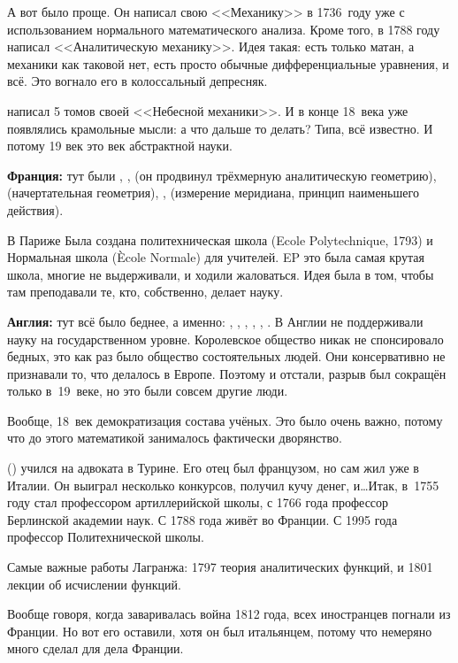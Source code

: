 \documentclass[a4paper,oneside,fleqn,10pt]{article}
\begin{document}
А вот  было проще. Он написал свою <<Механику>> в
1736~году уже с использованием нормального математического
анализа. Кроме того, в 1788 году  написал
<<Аналитическую механику>>. Идея такая: есть только матан, а механики
как таковой нет, есть просто обычные дифференциальные уравнения, и
всё. Это вогнало его в колоссальный депресняк.

  написал 5 томов своей <<Небесной
механики>>. И в конце 18~века уже появлялись крамольные мысли: а что
дальше то делать? Типа, всё известно.  И потому 19 век это век
абстрактной науки.

\textbf{Франция:} тут были , , 
(он продвинул трёхмерную аналитическую геометрию), 
(начертательная геометрия), , 
(измерение меридиана, принцип наименьшего действия).

В Париже Была создана политехническая школа (Ecole Polytechnique,
1793) и Нормальная школа (\`Ecole Normale) для учителей.  EP это была
самая крутая школа, многие не выдерживали, и ходили жаловаться.  Идея
была в том, чтобы там преподавали те, кто, собственно, делает науку.

\textbf{Англия:} тут всё было беднее, а именно: ,
, , , ,
.  В Англии не поддерживали науку на государственном
уровне. Королевское общество никак не спонсировало бедных, это как раз
было общество состоятельных людей.  Они консервативно не признавали
то, что делалось в Европе. Поэтому и отстали, разрыв был сокращён
только в~19~веке, но это были совсем другие люди.

Вообще, 18~век демократизация состава учёных.  Это было очень важно,
потому что до этого математикой занималось фактически дворянство.

 () учился на адвоката в Турине. Его отец
был французом, но сам жил уже в Италии. Он выиграл несколько
конкурсов, получил кучу денег, и\ldots Итак, в~1755 году стал
профессором артиллерийской школы, с 1766 года профессор Берлинской
академии наук. С 1788 года живёт во Франции. С 1995 года профессор
Политехнической школы.

Самые важные работы Лагранжа: 1797 теория аналитических функций, и
1801 лекции об исчислении функций.

Вообще говоря, когда заваривалась война 1812 года, всех иностранцев
погнали из Франции.  Но вот его оставили, хотя он был итальянцем,
потому что немеряно много сделал для дела Франции.
\end{document}
